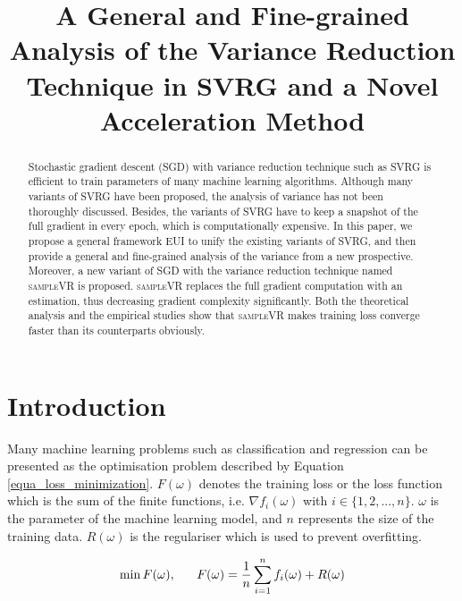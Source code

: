 \documentclass[letterpaper]{article}
\begin{document}
%
\title{A General and Fine-grained Analysis of the Variance Reduction Technique in SVRG and a Novel Acceleration Method}
\maketitle
\begin{abstract}
Stochastic gradient descent (SGD) with variance reduction  technique such as SVRG is efficient to train parameters of many machine learning algorithms. Although many variants of SVRG have been proposed,  the analysis of variance has not been thoroughly discussed. Besides,  the variants of SVRG have to keep a snapshot of the full gradient in every epoch, which is computationally expensive. In this paper, we propose a general framework EUI  to unify the existing variants of SVRG, and then  provide a general and fine-grained analysis of the variance from a new prospective. Moreover,   a new variant of SGD with the variance reduction technique named \textsc{sampleVR} is proposed. \textsc{sampleVR} replaces the full gradient computation with an estimation, thus decreasing gradient complexity significantly.  Both the theoretical analysis and the empirical studies show that \textsc{sampleVR} makes  training loss converge faster than its counterparts obviously. 
\end{abstract}

\section{Introduction}
\label{sect_introduction}
Many machine learning problems such as classification and regression  can be  presented as the optimisation problem described by Equation \ref{equa_loss_minimization}. $F(\omega)$ denotes the training loss or the loss function which is the sum of the finite functions, i.e. $\nabla f_i(\omega)$ with $i\in\{1,2, ..., n\}$. $\omega$ is the parameter of the machine learning model, and $n$ represents the size of the training data. $R(\omega)$ is the regulariser  which is used to prevent overfitting.    

\begin{equation}
\label{equa_loss_minimization}
\min F(\omega),~~~~~F(\omega)=\frac{1}{n}\sum\limits_{i=1}^n f_i(\omega)+R(\omega)\\
\end{equation}
\end{document}
